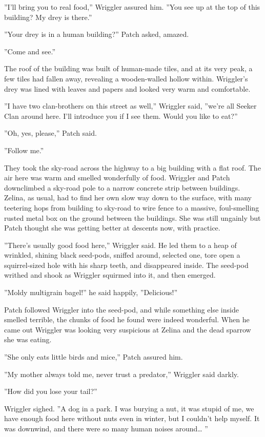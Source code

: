 \documentclass[12pt]{book}
\begin{document}
''I'll bring you to real food,'' Wriggler assured him. ''You see up at
the top of this building? My drey is there.''

''Your drey is in a human building?'' Patch asked, amazed.

''Come and see.''

The roof of the building was built of human-made tiles, and at its
very peak, a few tiles had fallen away, revealing a wooden-walled
hollow within. Wriggler's drey was lined with leaves and papers and
looked very warm and comfortable.

''I have two clan-brothers on this street as well,'' Wriggler said,
''we're all Seeker Clan around here. I'll introduce you if I see
them. Would you like to eat?''

''Oh, yes, please,'' Patch said.

''Follow me.''

They took the sky-road across the highway to a big building with a
flat roof. The air here was warm and smelled wonderfully of
food. Wriggler and Patch downclimbed a sky-road pole to a narrow
concrete strip between buildings. Zelina, as usual, had to find her
own slow way down to the surface, with many teetering hops from
building to sky-road to wire fence to a massive, foul-smelling rusted
metal box on the ground between the buildings. She was still ungainly
but Patch thought she was getting better at descents now, with
practice.

''There's usually good food here,'' Wriggler said. He led them to a
heap of wrinkled, shining black seed-pods, sniffed around, selected
one, tore open a squirrel-sized hole with his sharp teeth, and
disappeared inside. The seed-pod writhed and shook as Wriggler
squirmed into it, and then emerged.

''Moldy multigrain bagel!'' he said happily, ''Delicious!''

Patch followed Wriggler into the seed-pod, and while something else
inside smelled terrible, the chunks of food he found were indeed
wonderful. When he came out Wriggler was looking very suspicious at
Zelina and the dead sparrow she was eating.

''She only eats little birds and mice,'' Patch assured him.

''My mother always told me, never trust a predator,'' Wriggler said
darkly.

''How did you lose your tail?''

Wriggler sighed. ''A dog in a park. I was burying a nut, it was stupid
of me, we have enough food here without nuts even in winter, but I
couldn't help myself. It was downwind, and there were so many human
noises around\ldots{} ''
\end{document}
